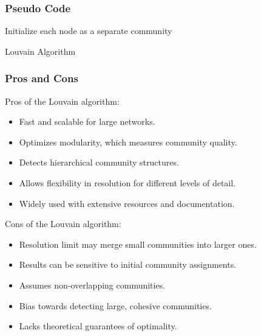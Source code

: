 \subsubsection{Pseudo Code}
\begin{algorithm}[H]
\SetAlgoLined
{}
Initialize each node as a separate community\;

\caption{Louvain Algorithm}
\end{algorithm}

\subsubsection{Pros and Cons}

Pros of the Louvain algorithm:
\begin{itemize}
    \item Fast and scalable for large networks.
    \item Optimizes modularity, which measures community quality.
    \item Detects hierarchical community structures.
    \item Allows flexibility in resolution for different levels of detail.
    \item Widely used with extensive resources and documentation.
\end{itemize}

Cons of the Louvain algorithm:
\begin{itemize}
    \item Resolution limit may merge small communities into larger ones.
    \item Results can be sensitive to initial community assignments.
    \item Assumes non-overlapping communities.
    \item Bias towards detecting large, cohesive communities.
    \item Lacks theoretical guarantees of optimality.
\end{itemize}


